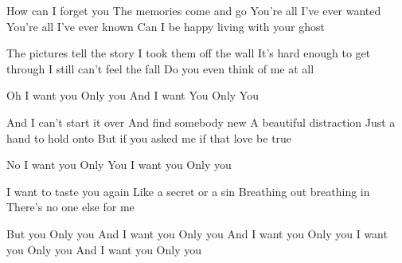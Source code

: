\resetVars%
%
%
\MakeHeader%
\Lyrics%
How can I forget you
The memories come and go
You're all I've ever wanted
You're all I've ever known
Can I be happy living with your ghost

The pictures tell the story
I took them off the wall
It's hard enough to get through
I still can't feel the fall
Do you even think of me at all

Oh I want you
Only you
And I want You
Only You

And I can't start it over
And find somebody new
A beautiful distraction
Just a hand to hold onto
But if you asked me if that love be true

No I want you
Only You
I want you
Only you

I want to taste you again
Like a secret or a sin
Breathing out breathing in
There's no one else for me

But you
Only you
And I want you
Only you
And I want you
Only you
I want you
Only you
And I want you
Only you
\Next

